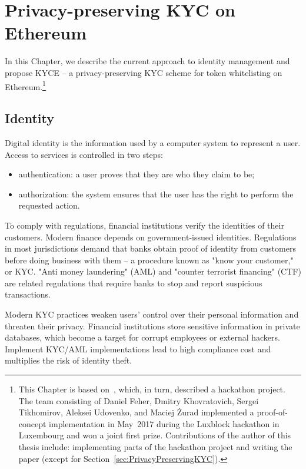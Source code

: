 \chapter{Privacy-preserving KYC on Ethereum}

\label{Chapter12KYC}

In this Chapter, we describe the current approach to identity management and propose KYCE -- a privacy-preserving KYC scheme for token whitelisting on Ethereum.\footnote{This Chapter is based on~\cite{Biryukov2018}, which, in turn, described a hackathon project. The team consisting of Daniel Feher, Dmitry Khovratovich, Sergei Tikhomirov, Aleksei Udovenko, and Maciej \.{Z}urad implemented a proof-of-concept implementation in May~2017 during the Luxblock hackathon in Luxembourg and won a joint first prize. Contributions of the author of this thesis include: implementing parts of the hackathon project and writing the paper (except for Section~\ref{sec:PrivacyPreservingKYC}).}


\section{Identity}

Digital identity is the information used by a computer system to represent a user.
Access to services is controlled in two steps:

\begin{itemize}
	\item authentication: a user proves that they are who they claim to be;
	\item authorization: the system ensures that the user has the right to perform the requested action.
\end{itemize}

To comply with regulations, financial institutions verify the identities of their customers.
Modern finance depends on government-issued identities.
Regulations in most jurisdictions demand that banks obtain proof of identity from customers before doing business with them -- a procedure known as "know your customer," or KYC.
"Anti money laundering" (AML) and "counter terrorist financing" (CTF) are related regulations that require banks to stop and report suspicious transactions.

Modern KYC practices weaken users' control over their personal information and threaten their privacy.
Financial institutions store sensitive information in private databases, which become a target for corrupt employees or external hackers.
Implement KYC/AML implementations lead to high compliance cost and multiplies the risk of identity theft.

